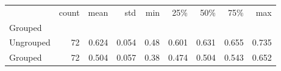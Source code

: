 \begin{tabular}{lrrrrrrrr}
\toprule
{} &  count &   mean &    std &   min &    25\% &    50\% &    75\% &    max \\
Grouped   &        &        &        &       &        &        &        &        \\
\midrule
Ungrouped &     72 &  0.624 &  0.054 &  0.48 &  0.601 &  0.631 &  0.655 &  0.735 \\
Grouped   &     72 &  0.504 &  0.057 &  0.38 &  0.474 &  0.504 &  0.543 &  0.652 \\
\bottomrule
\end{tabular}
